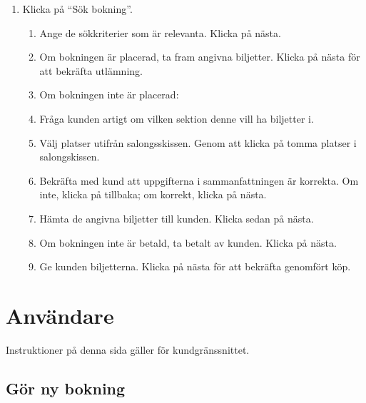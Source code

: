 \documentclass[a4paper, twoside, 11pt, titlepage]{article}
\begin{document}
		\begin{enumerate}
		\item Klicka på ``Sök bokning''.

		\begin{enumerate}
		\item Ange de sökkriterier som är relevanta. Klicka på nästa.

		\item Om bokningen är placerad, ta fram angivna biljetter. Klicka på nästa för att bekräfta utlämning.

		\item Om bokningen inte är placerad:

		\item Fråga kunden artigt om vilken sektion denne vill ha biljetter i.

		\item Välj platser utifrån salongsskissen. Genom att klicka på tomma platser i salongskissen.

		\item Bekräfta med kund att uppgifterna i sammanfattningen är korrekta.  Om inte, klicka på tillbaka; om korrekt, klicka på nästa.

		\item Hämta de angivna biljetter till kunden. Klicka sedan på nästa.

		\item Om bokningen inte är betald, ta betalt av kunden. Klicka på nästa.

		\item Ge kunden biljetterna. Klicka på nästa för att bekräfta genomfört köp.
		\end{enumerate}
		\end{enumerate}

\clearpage
\section{Användare}


Instruktioner på denna sida gäller för kundgränssnittet.

	\subsection{Gör ny bokning}
\end{document}
